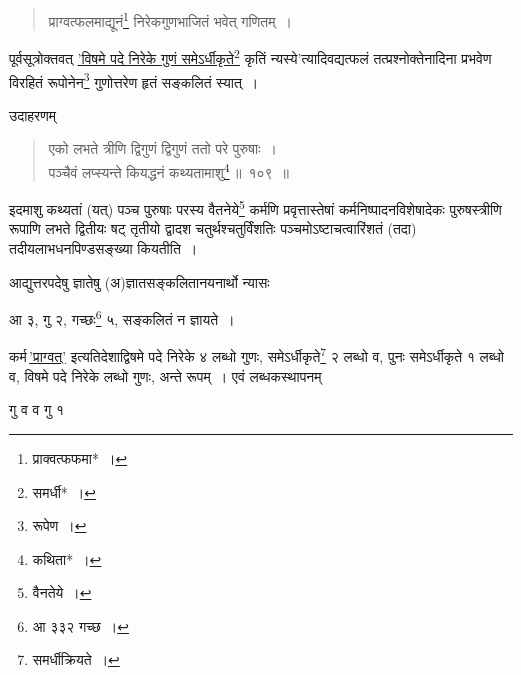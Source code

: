 \documentclass[10pt, openany]{book}
\begin{document}
{{{{{{{{{{{ \label{95.1}
\begin{quote}
    
{\bs  प्राग्वत्फलमाद्यूनं\renewcommand{\thefootnote}{१}\footnote{प्राक्वत्फफमा*~।} निरेकगुणभाजितं भवेत् गणितम्~।}\end{quote}

{पूर्वसूत्रोक्तवत् \hyperref[94]{'विषमे पदे निरेके गुणं समेऽर्धीकृते\renewcommand{\thefootnote}{२}\footnote{समर्धी*~।} कृतिं
न्यस्ये'}त्यादिवद्यत्फलं तत्प्रश्नोक्तेनादिना प्रभवेण विरहितं रूपोनेन\renewcommand{\thefootnote}{३}\footnote{रूपेण~।} गुणोत्तरेण हृतं सङ्कलितं स्यात्~।}
\vspace{3mm}

{उदाहरणम्\textendash}

\begin{quote}
    
{\eg एको लभते त्रीणि द्विगुणं द्विगुणं ततो परे पुरुषाः~।\\
पञ्चैवं लप्स्यन्ते कियद्धनं कथ्यतामाशु\renewcommand{\thefootnote}{४}\footnote{कथिता*~।}\,॥~१०९~॥}\end{quote}

{इदमाशु कथ्यतां (यत्) पञ्च पुरुषाः परस्य वैतनेये\renewcommand{\thefootnote}{५}\footnote{वैनतेये~।} कर्मणि
प्रवृत्तास्तेषां कर्मनिष्पादनविशेषादेकः पुरुषस्त्रीणि रूपाणि लभते द्वितीयः षट् तृतीयो द्वादश
चतुर्थश्चतुर्विंशतिः}
{पञ्चमोऽष्टाचत्वारिंशतं (तदा) तदीयलाभधनपिण्डसङ्ख्या कियतीति~।}
\vspace{3mm}

{आद्युत्तरपदेषु ज्ञातेषु (अ)ज्ञातसङ्कलितानयनार्थो न्यासः\textemdash}
\vspace{-1mm}

\begin{center}
    
{आ ३, गु २, गच्छः\renewcommand{\thefootnote}{६}\footnote{आ ३३२ गच्छ~।} ५, सङ्कलितं न ज्ञायते~।}\end{center}
\vspace{-1mm}

{कर्म\textendash \,\hyperref[95.1]{'प्राग्वत्'} इत्यतिदेशाद्विषमे पदे निरेके ४ लब्धो गुणः,
समेऽर्धीकृते\renewcommand{\thefootnote}{७}\footnote{समर्धीक्रियते~।} २ लब्धो व, पुनः समेऽर्धीकृते १ लब्धो व, विषमे पदे निरेके लब्धो गुणः, अन्ते रूपम्~। एवं
लब्धकस्थापनम्\textendash}
\vspace{-1mm}

\begin{center}
    
{गु व व गु १}\end{center}
\vspace{-1mm}

}}}}}}}}}}}
\end{document}
